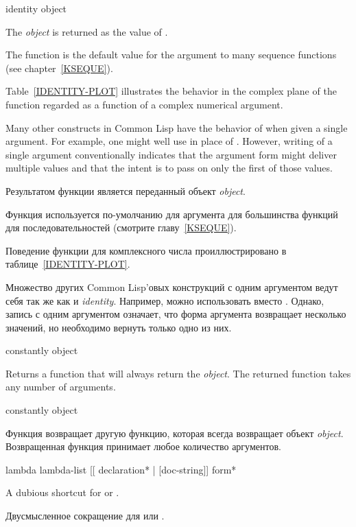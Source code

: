 \begin{defun}[Function]
identity object

The \emph{object} is returned as the value of .

The  function is the default value for the 
argument to many sequence functions (see chapter~\ref{KSEQUE}).

Table~\ref{IDENTITY-PLOT} illustrates the behavior in the complex plane
of the
 function regarded as a function of a complex numerical argument.

Many other constructs in Common Lisp have the behavior of 
when given a single argument.  For example, one might well use 
in place of .  However, writing  of a single
argument conventionally indicates that the argument form might deliver
multiple values and that the intent is to pass on only the first of
those values.

Результатом функции является переданный объект \emph{object}.

Функция  используется по-умолчанию для аргумента  для
большинства функций для последовательностей (смотрите главу~\ref{KSEQUE}).

Поведение функции  для комплексного числа проиллюстрировано в
таблице~\ref{IDENTITY-PLOT}.

Множество других Common Lisp'овых конструкций с одним аргументом ведут себя так
же как и \emph{identity}. Например, можно использовать  вместо
. Однако, запись  с одним аргументом означает, что
форма аргумента возвращает несколько значений, но необходимо вернуть только одно
из них.
\end{defun}

\begin{defun}[Function]
constantly object

Returns a function that will always return the \emph{object}. The returned function
takes any number of arguments.
\end{defun}

\begin{defun}[Функция]
constantly object

Функция возвращает другую функцию, которая всегда возвращает объект
\emph{object}. Возвращенная функция принимает любое количество аргументов.
\end{defun}

\begin{defmac}
lambda lambda-list [[ {declaration}* | [doc-string]] {form}*

A dubious shortcut for  or .

Двусмысленное сокращение для  или .
\end{defmac}
